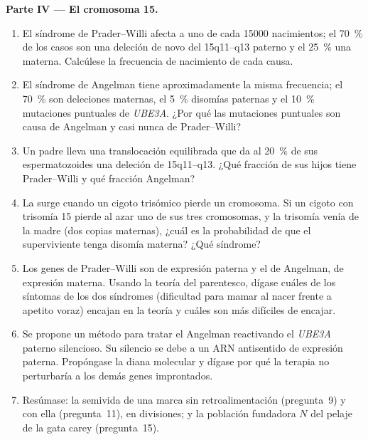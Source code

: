 \begin{problem}
\medskip
\noindent\textbf{Parte IV --- El cromosoma 15.}
\begin{enumerate}[resume]
  \item El síndrome de Prader--Willi afecta a uno de cada
        \num{15000} nacimientos; el \qty{70}{\%} de los casos son una
        deleción de novo del 15q11--q13 paterno y el \qty{25}{\%} una
         materna. Calcúlese la frecuencia de
        nacimiento de cada causa.
  \item El síndrome de Angelman tiene aproximadamente la misma
        frecuencia; el \qty{70}{\%} son deleciones maternas, el
        \qty{5}{\%} disomías paternas y el \qty{10}{\%} mutaciones
        puntuales de \emph{UBE3A}. ¿Por qué las mutaciones puntuales son
        causa de Angelman y casi nunca de Prader--Willi?
  \item Un padre lleva una translocación equilibrada que da al
        \qty{20}{\%} de sus espermatozoides una deleción de 15q11--q13.
        ¿Qué fracción de sus hijos tiene Prader--Willi y qué fracción
        Angelman?
  \item La  surge cuando un cigoto trisómico pierde un
        cromosoma. Si un cigoto con trisomía 15 pierde al azar uno de sus
        tres cromosomas, y la trisomía venía de la madre (dos copias
        maternas), ¿cuál es la probabilidad de que el superviviente tenga
        disomía materna? ¿Qué síndrome?
  \item Los genes de Prader--Willi son de expresión paterna y el de
        Angelman, de expresión materna. Usando la teoría del parentesco,
        dígase cuáles de los síntomas de los dos síndromes (dificultad
        para mamar al nacer frente a apetito voraz) encajan en la teoría
        y cuáles son más difíciles de encajar.
  \item Se propone un método para tratar el Angelman reactivando el
        \emph{UBE3A} paterno silencioso. Su silencio se debe a un ARN
        antisentido de expresión paterna. Propóngase la diana molecular y
        dígase por qué la terapia no perturbaría a los demás genes
        improntados.
  \item Resúmase: la semivida de una marca sin retroalimentación
        (pregunta~9) y con ella (pregunta~11), en divisiones; y la
        población fundadora $N$ del pelaje de la gata carey
        (pregunta~15).
\end{enumerate}
\end{problem}
